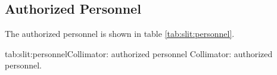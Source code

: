 \begin{safetyen}{10}{15}
\subsection{Authorized  Personnel} 
\end{safetyen}
The authorized personnel is shown in table \ref{tab:slit:personnel}.
\begin{namestab}{tab:slit:personnel}{Collimator: authorized personnel}{%
      Collimator: authorized personnel.}
\end{namestab}

%
%
%
%
%
%
